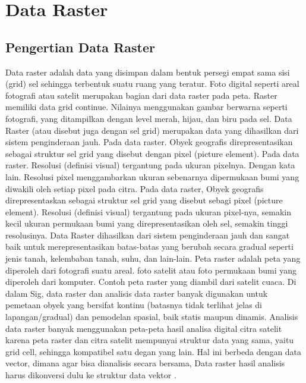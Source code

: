 
\section{Data Raster}
\subsection{Pengertian Data Raster}
Data raster \cite{puntodewo2003sistem} adalah data yang disimpan dalam bentuk persegi empat sama sisi (grid) sel sehingga terbentuk suatu ruang yang 
teratur. Foto digital seperti areal fotografi atau satelit merupakan bagian dari data raster pada peta. 
Raster memiliki data grid continue. Nilainya menggunakan gambar berwarna seperti fotografi, yang ditampilkan dengan 
level merah, hijau, dan biru pada sel. Data Raster (atau disebut juga dengan sel grid) merupakan data yang 
dihasilkan dari sistem penginderaan jauh. Pada data raster. Obyek geografis direpresentasikan sebagai struktur
sel grid yang disebut dengan pixel (picture element). Pada data raster. Resolusi (definisi visual) tergantung
pada ukuran pixelnya. Dengan kata lain. Resolusi pixel menggambarkan ukuran sebenarnya dipermukaan bumi 
yang diwakili oleh setiap pixel pada citra. Pada data raster, Obyek geografis direpresentaskan sebagai struktur sel grid yang disebut sebagi pixel (picture element). Resolusi (definisi visual) tergantung pada ukuran pixel-nya, semakin kecil ukuran permukaan bumi yang direpresentasikan oleh sel, semakin tinggi resolusinya. Data Raster dihasilkan dari sistem penginderaan jauh dan sangat baik untuk merepresentasikan batas-batas yang berubah secara gradual seperti jenis tanah, kelembaban tanah, suhu, dan lain-lain. Peta raster adalah peta yang diperoleh dari fotografi suatu areal. foto satelit atau foto permukaan bumi yang diperoleh dari komputer. Contoh peta raster yang diambil dari satelit cuaca. Di dalam Sig, data raster dan analisis data raster banyak digunakan untuk pemetaan obyek yang bersifat kontinu (batasnya tidak terlihat jelas di lapangan/gradual) dan pemodelan spasial, baik statis maupun dinamis. Analisis data raster banyak menggunakan peta-peta hasil analisa digital citra satelit karena peta raster dan citra satelit mempunyai struktur data yang sama, yaitu grid cell, sehingga kompatibel satu degan yang lain. Hal ini berbeda dengan data vector, dimana agar bisa dianalisis secara bersama, Data raster hasil analisis harus dikonversi dulu ke struktur data vektor \cite{puntodewo2003sistem}.

